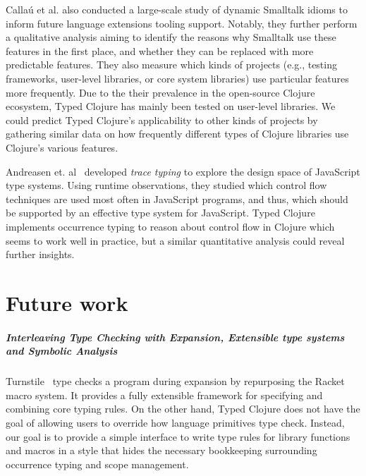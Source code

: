 \documentclass[11pt]{iuthesis}
\begin{document}
Calla{\'u} et al. \cite{Callau2013} also conducted a large-scale study of
dynamic Smalltalk idioms to inform future language extensions tooling support.
Notably, they further perform a qualitative analysis aiming to identify
the reasons why Smalltalk use these features in the first place, and
whether they can be replaced with more predictable features. They also 
measure which kinds of projects (e.g., testing frameworks, user-level libraries, or core system libraries) 
use particular features more frequently.
Due to the their prevalence in the open-source Clojure ecosystem,
Typed Clojure has mainly been tested on user-level libraries.
We could predict Typed Clojure's applicability to other kinds of projects
by gathering similar data on how frequently different types of Clojure libraries use
Clojure's various features.

Andreasen et. al~\cite{Andreasen2016TraceTA} developed
\emph{trace typing} to explore the design space of JavaScript type systems. 
Using runtime observations, they studied which control flow techniques
are used most often in JavaScript programs, and thus, which should
be supported by an effective type system for JavaScript.
Typed Clojure implements occurrence typing to reason about control
flow in Clojure which seems to work well in practice, but a similar
quantitative analysis could reveal further insights.


\chapter{Future work}


\paragraph{Interleaving Type Checking with Expansion, Extensible type systems and Symbolic Analysis}

Turnstile~\cite{Chang2017TSM} type checks a program during expansion
by repurposing the Racket macro system. It provides a fully extensible framework
for specifying and combining core typing rules.
On the other hand, Typed Clojure does not have the goal of allowing users to override
how language primitives type check. Instead, our goal is to provide
a simple interface to write type rules for library functions and macros
in a style that hides the necessary bookkeeping surrounding occurrence
typing and scope management.
\end{document}
